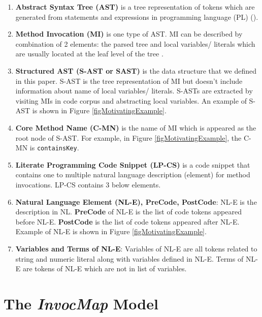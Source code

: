 \documentclass[sigconf,review,anonymous]{article}
\begin{document}
\begin{enumerate}[\indent {}]
        \item \textbf{Abstract Syntax Tree (AST)} is a tree representation of tokens which are generated from statements and expressions in programming language (PL) (\cite{011}).
        \item \textbf{Method Invocation (MI)} is one type of AST. MI can be described by combination of 2 elements: the parsed tree and local variables/ literals which are usually located at the leaf level of the tree \cite{012}. 
        \item \textbf{Structured AST (S-AST or SAST)} is the data structure that we defined in this paper. S-AST is the tree representation of MI but doesn't include information about name of local variables/ literals. S-ASTs are extracted by visiting MIs in code corpus and abstracting local variables. An example of S-AST is shown in Figure \ref{figMotivatingExample}.
        \item \textbf{Core Method Name (C-MN)} is the name of MI which is appeared as the root node of S-AST. For example, in Figure \ref{figMotivatingExample}, the C-MN is \texttt{containsKey}. 
        \item \textbf{Literate Programming Code Snippet (LP-CS)} is a code snippet that contains one to multiple natural language description (element) for method invocations. LP-CS contains 3 below elements.
        \item \textbf{Natural Language Element (NL-E), PreCode, PostCode}: NL-E is the description in NL. \textbf{PreCode} of NL-E is the list of code tokens appeared before NL-E. \textbf{PostCode} is the list of code tokens appeared after NL-E. Example of NL-E is shown in Figure \ref{figMotivatingExample}.
        
        \item \textbf{Variables and Terms of NL-E}: Variables of NL-E are all tokens related to string and numeric literal along with variables defined in NL-E. Terms of NL-E are tokens of NL-E which are not in list of variables. 
    \end{enumerate}




\section{The \textit{InvocMap} Model}
\end{document}
